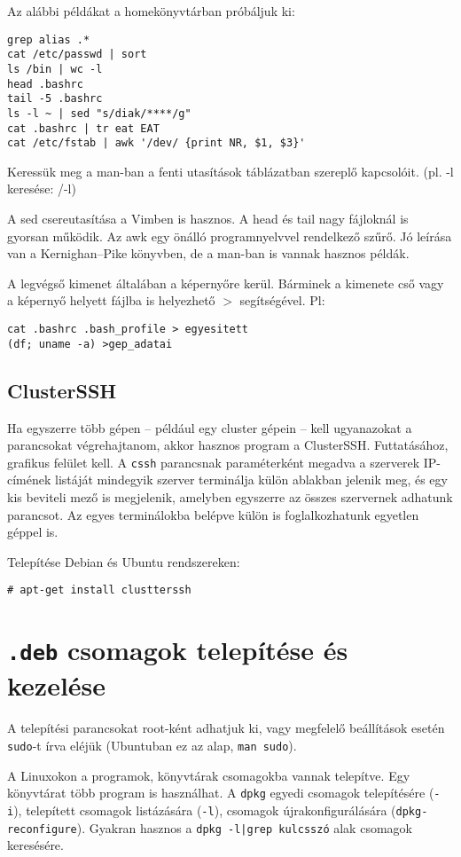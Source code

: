 \documentclass[a4paper]{article}
\newcommand{\code}{\texttt}
\begin{document}
Az alábbi példákat a homekönyvtárban próbáljuk ki:
\begin{Verbatim}
grep alias .*
cat /etc/passwd | sort
ls /bin | wc -l
head .bashrc
tail -5 .bashrc
ls -l ~ | sed "s/diak/****/g"
cat .bashrc | tr eat EAT
cat /etc/fstab | awk '/dev/ {print NR, $1, $3}'
\end{Verbatim}
Keressük meg a man-ban a fenti utasítások táblázatban szereplő
kapcsolóit. (pl. -l keresése: /-l)

A sed csereutasítása a Vimben is hasznos. A head és tail nagy fájloknál is
gyorsan működik. Az awk egy önálló programnyelvvel rendelkező szűrő.
Jó leírása van a Kernighan--Pike könyvben, de a man-ban is vannak
hasznos példák.

A legvégső kimenet általában a képernyőre kerül.  Bárminek a kimenete
cső vagy a képernyő  helyett fájlba is helyezhető $>$ segítségével.
Pl:
\begin{Verbatim}
cat .bashrc .bash_profile > egyesitett
(df; uname -a) >gep_adatai
\end{Verbatim}

\subsection{ClusterSSH}
Ha egyszerre több gépen -- például egy cluster gépein -- kell
ugyanazokat a parancsokat végrehajtanom, akkor hasznos program a
ClusterSSH. Futtatásához, grafikus felület kell. A \texttt{cssh}
parancsnak paraméterként megadva a szerverek IP-címének listáját
mindegyik szerver terminálja külön ablakban jelenik meg, és egy kis
beviteli mező is megjelenik, amelyben egyszerre az összes szervernek
adhatunk parancsot.  Az egyes terminálokba belépve külön is
foglalkozhatunk egyetlen géppel is.

Telepítése Debian és Ubuntu rendszereken:
\begin{Verbatim}
# apt-get install clustterssh
\end{Verbatim}

\newpage
\section{\code{.deb} csomagok telepítése és kezelése}

A telepítési parancsokat root-ként adhatjuk ki, vagy megfelelő
beállítások esetén \code{sudo}-t írva eléjük (Ubuntuban ez az alap,
\code{man sudo}).

A Linuxokon a programok, könyvtárak csomagokba vannak telepítve. Egy
könyvtárat több program is használhat. A \code{dpkg} egyedi csomagok
telepítésére  (\code{-i}), telepített csomagok listázására (\code{-l}),
csomagok újrakonfigurálására (\code{dpkg-reconfigure}).
Gyakran hasznos a \code{dpkg -l|grep kulcsszó} alak csomagok keresésére.
\end{document}

